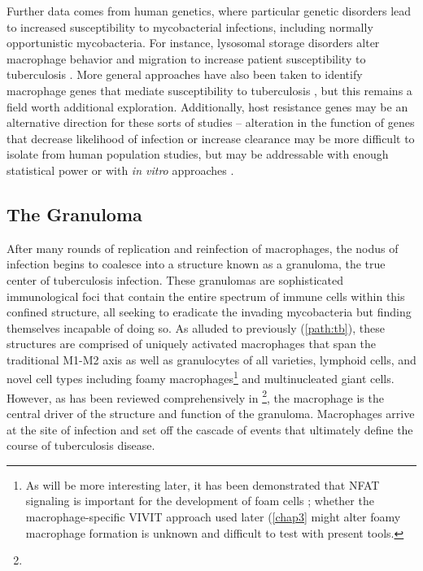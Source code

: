 Further data comes from human genetics, where particular genetic disorders lead to increased susceptibility to mycobacterial infections, including normally opportunistic mycobacteria. For instance, lysosomal storage disorders alter macrophage behavior and migration to increase patient susceptibility to tuberculosis \citep{Berg2016}. More general approaches have also been taken to identify macrophage genes that mediate susceptibility to tuberculosis \citep{Thuong2008}, but this remains a field worth additional exploration. Additionally, host resistance genes may be an alternative direction for these sorts of studies -- alteration in the function of genes that decrease likelihood of infection or increase clearance may be more difficult to isolate from human population studies, but may be addressable with enough statistical power or with \textit{in vitro} approaches \citep{Bourgeois2021}.

\subsection{The Granuloma}\label{mamaw}

After many rounds of replication and reinfection of macrophages, the nodus of infection begins to coalesce into a structure known as a granuloma, the true center of tuberculosis infection. These granulomas are sophisticated immunological foci that contain the entire spectrum of immune cells within this confined structure, all seeking to eradicate the invading mycobacteria but finding themselves incapable of doing so. As alluded to previously (\autoref{path:tb}), these structures are comprised of uniquely activated macrophages that span the traditional M1\hyp{}M2 axis as well as granulocytes of all varieties, lymphoid cells, and novel cell types including foamy macrophages\footnote{As will be more interesting later, it has been demonstrated that NFAT signaling is important for the development of foam cells \citep{Du2021}; whether the macrophage\hyp{}specific VIVIT approach used later (\autoref{chap3} might alter foamy macrophage formation is unknown and difficult to test with present tools.} and multinucleated giant cells. However, as has been reviewed comprehensively in \citep{Pagan2018}\footnote{}, the macrophage is the central driver of the structure and function of the granuloma. Macrophages arrive at the site of infection and set off the cascade of events that ultimately define the course of tuberculosis disease.

